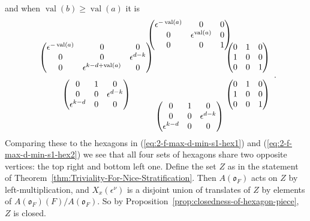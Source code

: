 \documentclass{amsart}
\theoremstyle{definition}
\def\O{\mathfrak{o}}
\def\e{\epsilon}
\def\val{\mathop{\mathrm{val}}}
\def\A{A(\O_F)}
\def\en{\e^{\nu}}
\def\X{X_x(\en)}
\def\heximages#1#2#3#4#5#6{
  \heximagessqueezedcarefully{1.7em}{-1em}{#1}{#2}{#3}{#4}{#5}{#6}
}
\def\heximagessqueezedcarefully#1#2#3#4#5#6#7#8{
  \begin{array}{ccc}
    & #3 & \\[#2]
    #5 \hspace{-#1} & & \hspace{-#1} #4 \\[2em]
    #6 \hspace{-#1} & & \hspace{-#1} #7 \\[#2]
    & #8 &
  \end{array}
}
\begin{document}
  and when $\val(b) \ge \val(a)$ it is
  \begin{equation*}
    \heximages
        {
          \begin{pmatrix}
            \e^{-\val(a)} & 0 & 0 \\ 
            0 & \e^{\val(a)} & 0 \\
            0 & 0 & 1
          \end{pmatrix}
        }
        {
          \begin{pmatrix}
            0 & 1 & 0 \\
            1 & 0 & 0 \\
            0 & 0 & 1
          \end{pmatrix}
        }
        {
          \begin{pmatrix}
            \e^{-\val(a)} & 0 & 0 \\
            0 & 0 & \e^{d - k} \\
            0 & \e^{k - d + \val(a)}  & 0
          \end{pmatrix} 
        }
        {
          \begin{pmatrix}
            0 & 1 & 0 \\
            0 & 0 & \e^{d - k} \\
            \e^{k-d} & 0 & 0
           \end{pmatrix}
        }
        {
          \begin{pmatrix}
            0 & 1 & 0 \\
            1 & 0 & 0 \\
            0 & 0 & 1
          \end{pmatrix}
        }
        {
          \begin{pmatrix}
            0 & 1 & 0 \\
            0 & 0 & \e^{d - k} \\
            \e^{k-d} & 0 & 0
          \end{pmatrix}
        }.
  \end{equation*}
  Comparing these to the hexagons in (\ref{eq:2-f-max-d-min-s1-hex1}) and
  (\ref{eq:2-f-max-d-min-s1-hex2}) we see that all four sets of hexagons share
  two opposite vertices: the top right and bottom left one.  Define the set $Z$
  as in the statement of Theorem~\ref{thm:Triviality-For-Nice-Stratification}.
  Then $\A$ acts on $Z$ by left-multiplication, and $\X$ is a disjoint union of
  translates of $Z$ by elements of $\A(F)/\A$.  So by
  Proposition~\ref{prop:closedness-of-hexagon-piece}, $Z$ is closed.
\end{document}
